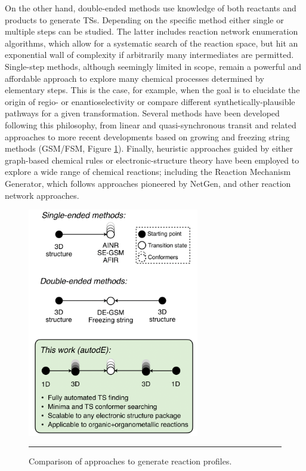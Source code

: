 \documentclass[../../main.tex]{subfiles}
\begin{document}
On the other hand, double-ended methods use knowledge of both reactants and products to generate TSs. Depending on the specific method either single or multiple steps can be studied. The latter includes reaction network enumeration algorithms, which allow for a systematic search of the reaction space, but hit an exponential wall of complexity if arbitrarily many intermediates are permitted.\cite{Kim2018, Habershon2016} Single-step methods, although seemingly limited in scope, remain a powerful and affordable approach to explore many chemical processes determined by elementary steps. This is the case, for example, when the goal is to elucidate the origin of regio- or enantioselectivity or compare different synthetically-plausible pathways for a given transformation. Several methods have been developed following this philosophy, from linear and quasi-synchronous transit\cite{Halgren1977, Peng1993} and related approaches\cite{Dewar1984, Elber1987} to more recent developments based on growing\cite{Dohm2020} and freezing string methods\cite{Suleimanov2015, Behn2011} (GSM/FSM, Figure \ref{fig::ade_1}). Finally, heuristic approaches guided by either graph-based chemical rules or electronic-structure theory have been employed to explore a wide range of chemical reactions; including the Reaction Mechanism Generator,\cite{Gao2016} which follows approaches pioneered by NetGen,\cite{Broadbelt1994} and other reaction network approaches.\cite{Rappoport2019, Bergeler2015}


\begin{figure}[h!]
	\vspace{0.4cm}
	\centering
	\includegraphics[width=7.5cm]{5/autode/figs/fig1}
	\vspace{0.4cm}
	\hrule
	\caption{Comparison of approaches to generate reaction profiles.}
	\label{fig::ade_1}
\end{figure}
\end{document}
